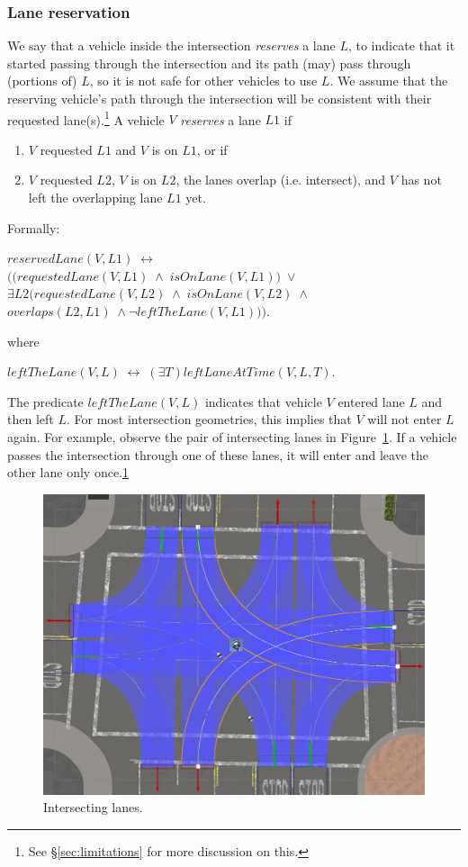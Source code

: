 \subsubsection{Lane reservation}
We say that
a vehicle inside the intersection \emph{reserves} a lane $L$,
to indicate that it started passing through the intersection
and its path (may) pass through (portions of) $L$,
so it is not safe for other vehicles to use $L$.
We assume that the reserving vehicle's path through the intersection
will be consistent with their requested lane(s).\footnote{\label{foot:limitations}See \S \ref{sec:limitations} for more discussion on this.}
A vehicle $V$ \emph{reserves} a lane $L1$ if
\begin{enumerate}
    \item 
    $V$ requested $L1$ and $V$ is on $L1$,
    or if
    \item
    $V$ requested $L2$,
    $V$ is on $L2$,
    the lanes overlap (i.e. intersect),
    and $V$ has not left the overlapping lane $L1$ yet.
\end{enumerate}
Formally:
\begin{center}
    $ reservedLane(V, L1) \; \leftrightarrow $ \\
    $ \Bigg(  \Big(  requestedLane(V, L1) \; \land \; isOnLane(V, L1) \Big) \; \lor $ \\
    $ \exists L2 \Big( requestedLane(V, L2) \; \land \; isOnLane(V, L2) \; \land$ \\
    $ overlaps(L2, L1) \; \land \neg leftTheLane(V, L1) \Big) \Bigg).$
\end{center}
where
\begin{center}
    $ leftTheLane(V, L) \; \leftrightarrow \; (\exists T) leftLaneAtTime(V, L, T) $.
\end{center}
The predicate $leftTheLane(V, L)$ indicates that
vehicle $V$ entered lane $L$ and then left $L$.
For most intersection geometries,
this implies that $V$ will not enter $L$ again.
For example,
observe the pair of intersecting lanes in Figure~\ref{fig:lane-intersection}.
If a vehicle passes the intersection through one of these lanes,
it will enter and leave the other lane only once.\ref{foot:limitations}
\begin{figure}
\centering
\includegraphics[width=0.5\linewidth]{figures/chapter3/lane_intersection.png}
\caption{Intersecting lanes.}
\label{fig:lane-intersection}
\vspace{-0.5cm}
\end{figure}
